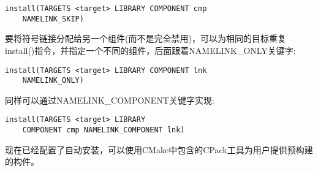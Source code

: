 \begin{lstlisting}[style=styleCMake]
install(TARGETS <target> LIBRARY COMPONENT cmp
	NAMELINK_SKIP)
\end{lstlisting}

要将符号链接分配给另一个组件(而不是完全禁用)，可以为相同的目标重复install()指令，并指定一个不同的组件，后面跟着NAMELINK\_ONLY关键字:

\begin{lstlisting}[style=styleCMake]
install(TARGETS <target> LIBRARY COMPONENT lnk
	NAMELINK_ONLY)
\end{lstlisting}

同样可以通过NAMELINK\_COMPONENT关键字实现:

\begin{lstlisting}[style=styleCMake]
install(TARGETS <target> LIBRARY
	COMPONENT cmp NAMELINK_COMPONENT lnk)
\end{lstlisting}

现在已经配置了自动安装，可以使用CMake中包含的CPack工具为用户提供预构建的构件。



















